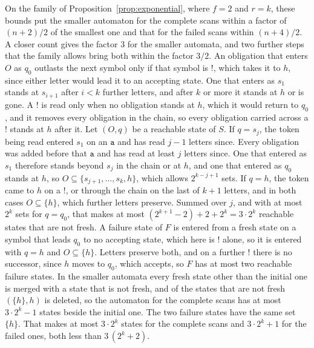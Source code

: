 \documentclass[11pt,a4paper]{article}
\theoremstyle{definition}
\theoremstyle{plain}
\newcommand{\code}[1]{\texttt{#1}}
\begin{document}
On the family of Proposition~\ref{prop:exponential}, where $f = 2$ and $r = k$, these bounds put the smaller automaton
for the complete scans within a factor of $(n + 2)/2$ of the smallest one and that for the failed scans within
$(n + 4)/2$. A closer count gives the factor $3$ for the smaller automata, and two further steps that the family allows
bring both within the factor $3/2$. An obligation that enters $O$ as $q_0$ outlasts the next symbol only if that symbol
is $\code{!}$, which takes it to $h$, since either letter would lead it to an accepting state. One that enters as $s_1$
stands at $s_{i+1}$ after $i < k$ further letters, and after $k$ or more it stands at $h$ or is gone. A $\code{!}$ is
read only when no obligation stands at $h$, which it would return to $q_0$, and it removes every obligation in the
chain, so every obligation carried across a $\code{!}$ stands at $h$ after it. Let $(O, q)$ be a reachable state of $S$.
If $q = s_j$, the token being read entered $s_1$ on an $\code{a}$ and has read $j - 1$ letters since. Every obligation
was added before that $\code{a}$ and has read at least $j$ letters since. One that entered as $s_1$ therefore stands
beyond $s_j$ in the chain or at $h$, and one that entered as $q_0$ stands at $h$, so
$O \subseteq \{s_{j+1}, \ldots, s_k, h\}$, which allows $2^{k-j+1}$ sets. If $q = h$, the token came to $h$ on a
$\code{!}$, or through the chain on the last of $k + 1$ letters, and in both cases $O \subseteq \{h\}$, which further
letters preserve. Summed over $j$, and with at most $2^k$ sets for $q = q_0$, that makes at most
$(2^{k+1} - 2) + 2 + 2^k = 3 \cdot 2^k$ reachable states that are not fresh. A failure state of $F$ is entered from a
fresh state on a symbol that leads $q_0$ to no accepting state, which here is $\code{!}$ alone, so it is entered with
$q = h$ and $O \subseteq \{h\}$. Letters preserve both, and on a further $\code{!}$ there is no successor, since $h$
moves to $q_0$, which accepts, so $F$ has at most two reachable failure states. In the smaller automata every fresh
state other than the initial one is merged with a state that is not fresh, and of the states that are not fresh
$(\{h\}, h)$ is deleted, so the automaton for the complete scans has at most $3 \cdot 2^k - 1$ states beside the initial
one. The two failure states have the same set $\{h\}$. That makes at most $3 \cdot 2^k$ states for the complete scans
and $3 \cdot 2^k + 1$ for the failed ones, both less than $3\,(2^k + 2)$.
\end{document}
